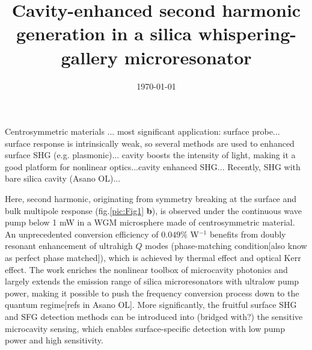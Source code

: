 \documentclass[a4paper,8pt,hyperref, twocolumn]{article}
\title{\bfseries \Large Cavity-enhanced second harmonic generation in a silica whispering-gallery microresonator}
\date{\normalsize \today}
\begin{document}
\maketitle



Centrosymmetric materials ... most significant application: surface probe... surface response is intrinsically weak, so several methods are used to enhanced surface SHG (e.g. plasmonic)... cavity boosts the intensity of light, making it a good platform for nonlinear optics...cavity enhanced SHG... Recently, SHG with bare silica cavity (Asano OL)...

Here, second harmonic, originating from symmetry breaking at the surface and bulk multipole response (fig.\ref{pic:Fig1} \textbf{b}), is observed under the continuous wave pump below 1 mW in a WGM microsphere made of centrosymmetric material. 
An unprecedented conversion efficiency of $0.049\%$ W$^{-1}$ benefits from doubly resonant enhancement of ultrahigh $Q$ modes (phase-matching condition[also know as perfect phase matched]), which is achieved by thermal effect and optical Kerr effect. 
The work enriches the nonlinear toolbox of microcavity photonics and largely extends the emission range of silica microresonators with ultralow pump power, making it possible to push the frequency conversion process down to the quantum regime[refs in Asano OL]. More significantly, the fruitful surface SHG and SFG detection methods can be introduced into (bridged with?) the sensitive microcavity sensing, which enables surface-specific detection with low pump power and high sensitivity.
\end{document}

